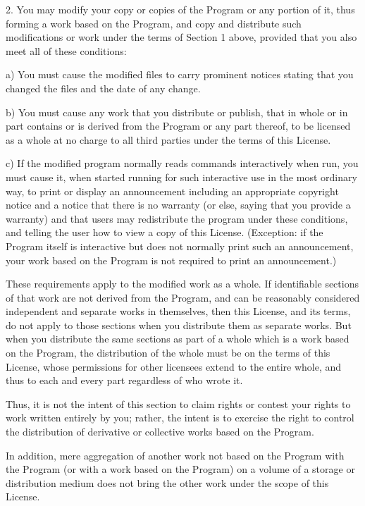 \begin{small}
2. You may modify your copy or copies of the Program or any portion of it,
thus forming a work based on the Program, and copy and distribute such
modifications or work under the terms of Section 1 above, provided that you
also meet all of these conditions:

    a) You must cause the modified files to carry prominent notices stating
that you changed the files and the date of any change.

    b) You must cause any work that you distribute or publish, that in whole
or in part contains or is derived from the Program or any part thereof, to be
licensed as a whole at no charge to all third parties under the terms of this
License.

    c) If the modified program normally reads commands interactively when run,
you must cause it, when started running for such interactive use in the most
ordinary way, to print or display an announcement including an appropriate
copyright notice and a notice that there is no warranty (or else, saying that
you provide a warranty) and that users may redistribute the program under
these conditions, and telling the user how to view a copy of this License.
(Exception: if the Program itself is interactive but does not normally print
such an announcement, your work based on the Program is not required to print
an announcement.)

These requirements apply to the modified work as a whole. If identifiable
sections of that work are not derived from the Program, and can be reasonably
considered independent and separate works in themselves, then this License,
and its terms, do not apply to those sections when you distribute them as
separate works. But when you distribute the same sections as part of a whole
which is a work based on the Program, the distribution of the whole must be on
the terms of this License, whose permissions for other licensees extend to the
entire whole, and thus to each and every part regardless of who wrote it.

Thus, it is not the intent of this section to claim rights or contest your
rights to work written entirely by you; rather, the intent is to exercise the
right to control the distribution of derivative or collective works based on
the Program.

In addition, mere aggregation of another work not based on the Program with
the Program (or with a work based on the Program) on a volume of a storage or
distribution medium does not bring the other work under the scope of this
License.


\end{small}
